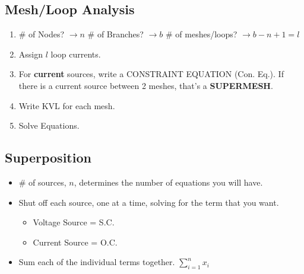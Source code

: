 \documentclass[10pt,letterpaper,final,twoside,notitlepage]{article}
\begin{document}
	\subsection*{Mesh/Loop Analysis} \label{subsec:Mesh Analysis}
		\begin{enumerate}
			\item \# of Nodes? $\rightarrow n$ \# of Branches? $\rightarrow b$ \# of meshes/loops? $\rightarrow b-n+1 = l$
			\item Assign $l$ loop currents.
			\item For \textbf{current} sources, write a CONSTRAINT EQUATION (Con. Eq.). If there is a current source between 2 meshes, that's a \textbf{SUPERMESH}.
			\item Write KVL for each mesh.
			\item Solve Equations.
		\end{enumerate}
	\subsection*{Superposition} \label{subsec:Superposition}
		\begin{itemize}[noitemsep, nolistsep]
			\item \# of sources, $n$, determines the number of equations you will have.
			\item Shut off each source, one at a time, solving for the term that you want.
			\begin{itemize}[noitemsep, nolistsep]
				\item Voltage Source = S.C.
				\item Current Source = O.C.
			\end{itemize}
			\item Sum each of the individual terms together. $\sum_{i=1}^{n} x_{i}$
		\end{itemize}
\end{document}
